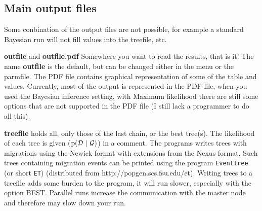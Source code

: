 \begin{description}
\subsection{Main output files}
Some conbination of the output files are not possible, for example a standard Bayesian run will not fill values into the treefile, etc.
\begin{description}
\item{\bf outfile} and {\bf outfile.pdf}  Somewhere you want to read the results, that is it! The name \textbf{outfile} is the default, but can be changed either in the menu or the parmfile. The PDF file contains graphical representation of some of the table and values. Currently, most of the output is represented in the PDF file, when you used the Bayesian inference setting, with Maximum likelihood there are still some options that are not supported in the PDF file (I still lack a programmer to do all this).
\end{description}
\begin{description}
\item{\bf treefile} holds all, only those of the last chain, or 
the best tree(s). The likelihood of each tree is given (${\rm p}(\mathcal D\ |\ \mathcal{G})$) in a comment. The programs writes trees with migrations using the Newick format with extensions from the Nexus format. Such trees containing migration events can be printed using the program \texttt{Eventtree} (or short \texttt{ET}) (distributed from http://popgen.scs.fsu.edu/et).
Writing trees to a treefile adds
some burden to the program, it will run slower, especially with the option BEST. Parallel runs increase the communication with the master node and therefore may slow down your run. 

%


\end{description}
\end{description}
